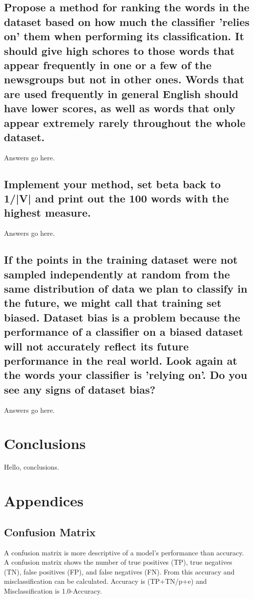 \documentclass{IEEEtran}
\begin{document}
\subsection{Propose a method for ranking the words in the dataset based on how much the classifier 'relies on' them when performing its classification. It should give high schores to those words that appear frequently in one or a few of the newsgroups but not in other ones. Words that are used frequently in general English should have lower scores, as well as words that only appear extremely rarely throughout the whole dataset.}
Answers go here.

\subsection{Implement your method, set beta back to 1/|V| and print out the 100 words with the highest measure.}
Answers go here.

\subsection{If the points in the training dataset were not sampled independently at random from the same distribution of data we plan to classify in the future, we might call that training set biased. Dataset bias is a problem because the performance of a classifier on a biased dataset will not accurately reflect its future performance in the real world. Look again at the words your classifier is 'relying on'. Do you see any signs of dataset bias?}
Answers go here.

\section{Conclusions}
Hello, conclusions.

\printbibliography

\newpage
\onecolumn
\appendix
\section{Appendices}
\subsection{Confusion Matrix}
A confusion matrix is more descriptive of a model's performance than accuracy. A confusion matrix shows the number of true positives (TP), true negatives (TN), false positives (FP), and false negatives (FN). From this accuracy and misclassification can be calculated. Accuracy is (TP+TN/p+e) and Misclassification is 1.0-Accuracy.
\end{document}
